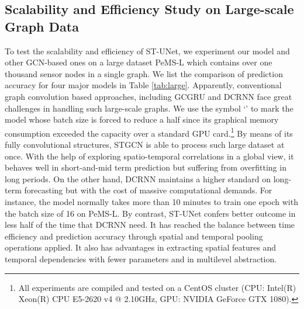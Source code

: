 \documentclass[sigconf,screen]{acmart}
\begin{document}
\subsection{Scalability and Efficiency Study on Large-scale Graph Data}
To test the scalability and efficiency of ST-UNet, we experiment our model and other GCN-based ones on a large dataset PeMS-L which contains over one thousand sensor nodes in a single graph. We list the comparison of prediction accuracy for four major models in Table \ref{tab:large}. Apparently, conventional graph convolution based approaches, including GCGRU and DCRNN face great challenges in handling such large-scale graphs. We use the symbol `' to mark the model whose batch size is forced to reduce a half since its graphical memory consumption exceeded the capacity over a standard GPU card.\footnote{All experiments are compiled and tested on a CentOS cluster (CPU: Intel(R) Xeon(R) CPU E5-2620 v4 @ 2.10GHz, GPU: NVIDIA GeForce GTX 1080).} By means of its fully convolutional structures, STGCN is able to process such large dataset at once. With the help of exploring spatio-temporal correlations in a global view, it behaves well in short-and-mid term prediction but suffering from overfitting in long periods. On the other hand, DCRNN maintains a higher standard on long-term forecasting but with the cost of massive computational demands. For instance, the model normally takes more than 10 minutes to train one epoch with the batch size of 16 on PeMS-L. By contrast, ST-UNet confers better outcome in less half of the time that DCRNN need. It has reached the balance between time efficiency and prediction accuracy through spatial and temporal pooling operations applied. It also has advantages in extracting spatial features and temporal dependencies with fewer parameters and in multilevel abstraction.

\begin{table}
\centering
\caption{\label{tab:large}Comparison of GCN-based models in terms of prediction accuracy on the large-scale dataset PeMS-L.}
\end{table}
\end{document}
